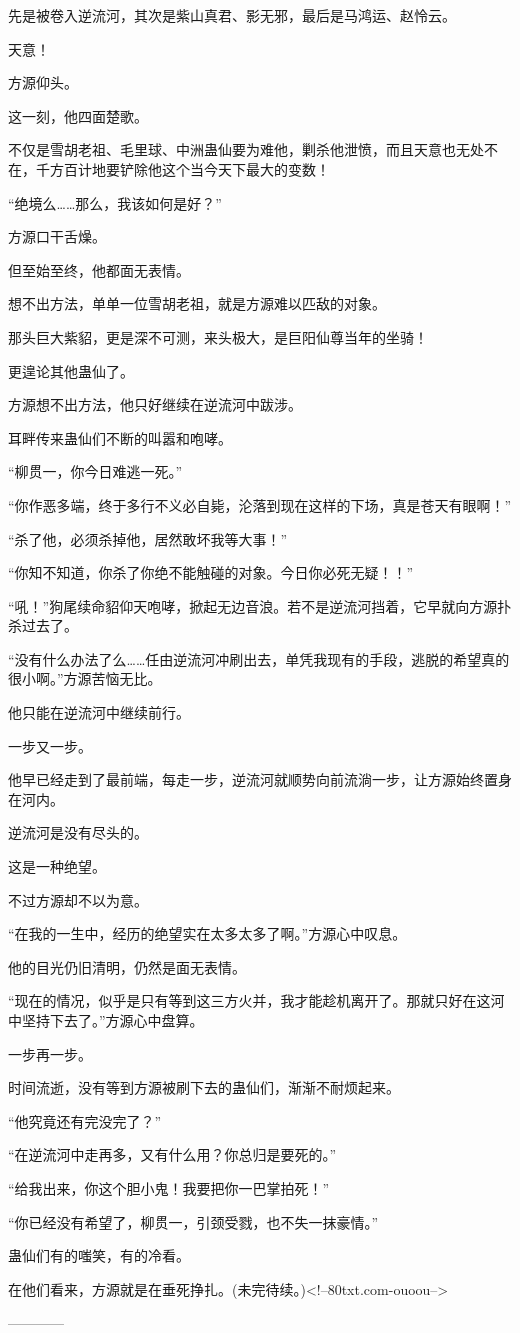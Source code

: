 \begin{this_body}
先是被卷入逆流河，其次是紫山真君、影无邪，最后是马鸿运、赵怜云。

天意！

方源仰头。

这一刻，他四面楚歌。

不仅是雪胡老祖、毛里球、中洲蛊仙要为难他，剿杀他泄愤，而且天意也无处不在，千方百计地要铲除他这个当今天下最大的变数！

“绝境么……那么，我该如何是好？”

方源口干舌燥。

但至始至终，他都面无表情。

想不出方法，单单一位雪胡老祖，就是方源难以匹敌的对象。

那头巨大紫貂，更是深不可测，来头极大，是巨阳仙尊当年的坐骑！

更遑论其他蛊仙了。

方源想不出方法，他只好继续在逆流河中跋涉。

耳畔传来蛊仙们不断的叫嚣和咆哮。

“柳贯一，你今日难逃一死。”

“你作恶多端，终于多行不义必自毙，沦落到现在这样的下场，真是苍天有眼啊！”

“杀了他，必须杀掉他，居然敢坏我等大事！”

“你知不知道，你杀了你绝不能触碰的对象。今日你必死无疑！！”

“吼！”狗尾续命貂仰天咆哮，掀起无边音浪。若不是逆流河挡着，它早就向方源扑杀过去了。

“没有什么办法了么……任由逆流河冲刷出去，单凭我现有的手段，逃脱的希望真的很小啊。”方源苦恼无比。

他只能在逆流河中继续前行。

一步又一步。

他早已经走到了最前端，每走一步，逆流河就顺势向前流淌一步，让方源始终置身在河内。

逆流河是没有尽头的。

这是一种绝望。

不过方源却不以为意。

“在我的一生中，经历的绝望实在太多太多了啊。”方源心中叹息。

他的目光仍旧清明，仍然是面无表情。

“现在的情况，似乎是只有等到这三方火并，我才能趁机离开了。那就只好在这河中坚持下去了。”方源心中盘算。

一步再一步。

时间流逝，没有等到方源被刷下去的蛊仙们，渐渐不耐烦起来。

“他究竟还有完没完了？”

“在逆流河中走再多，又有什么用？你总归是要死的。”

“给我出来，你这个胆小鬼！我要把你一巴掌拍死！”

“你已经没有希望了，柳贯一，引颈受戮，也不失一抹豪情。”

蛊仙们有的嗤笑，有的冷看。

在他们看来，方源就是在垂死挣扎。(未完待续。)<!--80txt.com-ouoou-->

------------

\end{this_body}

